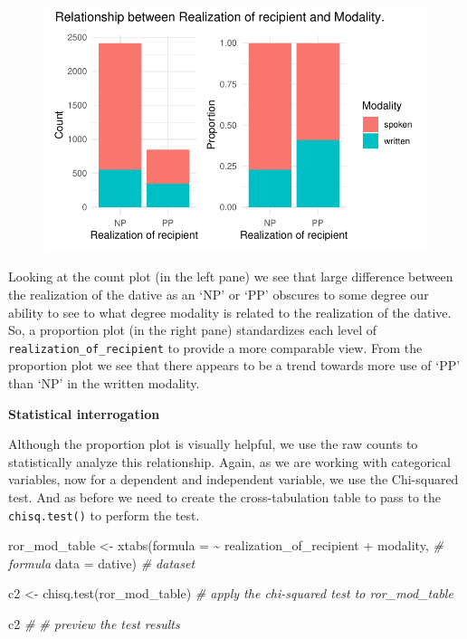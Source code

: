 \documentclass[
  letterpaper,
]{scrbook}
\newenvironment{Shaded}{\begin{snugshade}}{\end{snugshade}}
\newcommand{\AttributeTok}[1]{\textcolor[rgb]{0.00,0.00,0.00}{#1}}
\newcommand{\CommentTok}[1]{\textcolor[rgb]{0.00,0.00,0.00}{\textit{#1}}}
\newcommand{\FunctionTok}[1]{\textcolor[rgb]{0.00,0.00,0.00}{#1}}
\newcommand{\NormalTok}[1]{\textcolor[rgb]{0.00,0.00,0.00}{#1}}
\newcommand{\OtherTok}[1]{\textcolor[rgb]{0.00,0.00,0.00}{#1}}
\newcommand{\SpecialCharTok}[1]{\textcolor[rgb]{0.00,0.00,0.00}{#1}}
\begin{document}
\begin{figure}[h]

{\centering \includegraphics{./inference_files/figure-pdf/i-bi-cat-visual-1.pdf}

}

\end{figure}

Looking at the count plot (in the left pane) we see that large
difference between the realization of the dative as an `NP' or `PP'
obscures to some degree our ability to see to what degree modality is
related to the realization of the dative. So, a proportion plot (in the
right pane) standardizes each level of
\texttt{realization\_of\_recipient} to provide a more comparable view.
From the proportion plot we see that there appears to be a trend towards
more use of `PP' than `NP' in the written modality.

\textbf{Statistical interrogation}

Although the proportion plot is visually helpful, we use the raw counts
to statistically analyze this relationship. Again, as we are working
with categorical variables, now for a dependent and independent
variable, we use the Chi-squared test. And as before we need to create
the cross-tabulation table to pass to the \texttt{chisq.test()} to
perform the test.

\begin{Shaded}
\begin{Highlighting}[]
\NormalTok{ror\_mod\_table }\OtherTok{\textless{}{-}} 
  \FunctionTok{xtabs}\NormalTok{(}\AttributeTok{formula =} \SpecialCharTok{\textasciitilde{}}\NormalTok{ realization\_of\_recipient }\SpecialCharTok{+}\NormalTok{ modality, }\CommentTok{\# formula }
        \AttributeTok{data =}\NormalTok{ dative) }\CommentTok{\# dataset}

\NormalTok{c2 }\OtherTok{\textless{}{-}} \FunctionTok{chisq.test}\NormalTok{(ror\_mod\_table) }\CommentTok{\# apply the chi{-}squared test to \textasciigrave{}ror\_mod\_table\textasciigrave{}}

\NormalTok{c2 }\CommentTok{\# \# preview the test results}
\end{Highlighting}
\end{Shaded}
\end{document}
